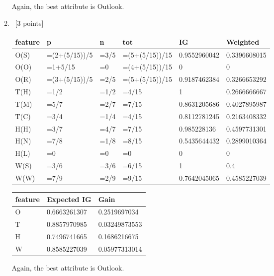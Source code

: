 \documentclass[12pt, fullpage,letterpaper]{article}
\begin{document}
\begin{enumerate}
\begin{enumerate}
Again, the best attribute is Outlook.


\item~[3 points] 


\begin{tabular}{|l|l|l|l|l|l|}
	\hline
	feature & p             & n    & tot            & IG           & Weighted     \\ \hline
	O(S)    & =(2+(5/15))/5 & =3/5 & =(5+(5/15))/15 & 0.9552960042 & 0.3396608015 \\ \hline
	O(O)    & =1+5/15       & =0   & =(4+(5/15))/15 & 0            & 0            \\ \hline
	O(R)    & =(3+(5/15))/5 & =2/5 & =(5+(5/15))/15 & 0.9187462384 & 0.3266653292 \\ \hline
	T(H)    & =1/2          & =1/2 & =4/15          & 1            & 0.2666666667 \\ \hline
	T(M)    & =5/7          & =2/7 & =7/15          & 0.8631205686 & 0.4027895987 \\ \hline
	T(C)    & =3/4          & =1/4 & =4/15          & 0.8112781245 & 0.2163408332 \\ \hline
	H(H)    & =3/7          & =4/7 & =7/15          & 0.985228136  & 0.4597731301 \\ \hline
	H(N)    & =7/8          & =1/8 & =8/15          & 0.5435644432 & 0.2899010364 \\ \hline
	H(L)    & =0            & =0   & =0             & 0            & 0            \\ \hline
	W(S)    & =3/6          & =3/6 & =6/15          & 1            & 0.4          \\ \hline
	W(W)    & =7/9          & =2/9 & =9/15          & 0.7642045065 & 0.4585227039 \\ \hline
	\end{tabular}

	\begin{tabular}{|l|l|l|}
		\hline
		feature & Expected IG  & Gain          \\ \hline
		O       & 0.6663261307 & 0.2519697034  \\ \hline
		T       & 0.8857970985 & 0.03249873553 \\ \hline
		H       & 0.7496741665 & 0.1686216675  \\ \hline
		W       & 0.8585227039 & 0.05977313014 \\ \hline
		\end{tabular}


Again, the best attribute is Outlook.



\end{enumerate}
\end{enumerate}
\end{document}
